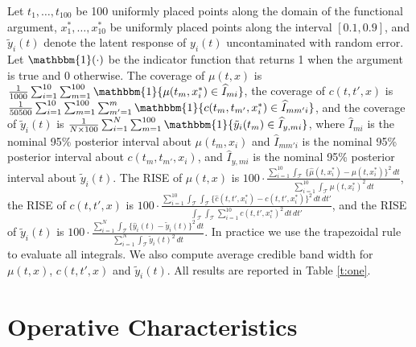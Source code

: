 \documentclass[useAMS,referee,usenatbib]{biom}
\begin{document}
Let $t_{1}, \ldots, t_{100}$ be 100 uniformly placed points along the domain of the functional argument, $x^{*}_{1},\ldots,x^{*}_{10}$ be uniformly placed points along the interval $[0.1, 0.9]$, and $\tilde{y}_{i}(t)$ denote the latent response of $y_{i}(t)$ uncontaminated with random error. Let $\mathbbm{1}(\cdot)$ be the indicator function that returns 1 when the argument is true and 0 otherwise. The coverage of $\mu(t, x)$ is $\frac{1}{1000}\sum_{i=1}^{10}\sum_{m=1}^{100}\mathbbm{1}\{\mu(t_{m}, x^{*}_{i}) \in \widehat{I}_{mi}\}$, the coverage of $c(t, t', x)$ is $\frac{1}{50500}\sum_{i=1}^{10}\sum_{m=1}^{100}\sum_{m'=1}^{m}\mathbbm{1}\{c(t_{m},t_{m'},x^{*}_{i})\in \widehat{I}_{mm'i}\}$, and the coverage of $\tilde{y}_{i}(t)$ is $\frac{1}{N\times 100}\sum_{i=1}^{N}\sum_{m=1}^{100}\mathbbm{1}\{\tilde{y}_{i}(t_{m}) \in \widehat{I}_{y,mi}\}$, where $\widehat{I}_{mi}$ is the nominal 95\% posterior interval about $\mu(t_{m}, x_{i})$ and $\widehat{I}_{mm'i}$ is the nominal 95\% posterior interval about $c(t_{m},t_{m'}, x_{i})$, and $\widehat{I}_{y,mi}$ is the nominal 95\% posterior interval about $\tilde{y}_{i}(t)$. The RISE of $\mu(t, x)$ is $100\cdot\frac{\sum_{i=1}^{10}\int_{\mathcal{T}}\,\{\widehat{\mu}(t, x^{*}_{i}) - \mu(t, x_{i}^{*})\}^{2}\,dt}{\sum_{i=1}^{10}\int_{\mathcal{T}}\mu(t, x_{i}^{*})^{2}\,dt}$, the RISE of $c(t, t', x)$ is $100 \cdot  \frac{\sum_{i=1}^{10}\int_{\mathcal{T}}\int_{\mathcal{T}}\{\widehat{c}(t,t', x_{i}^{*})-c(t,t',x_{i}^{*})\}^{2}\,dt\,dt'}{\int_{\mathcal{T}}\int_{\mathcal{T}}\sum_{i=1}^{10}c(t,t',x_{i}^{*})^{2}\,dt\,dt'}$, and the RISE of $\tilde{y}_{i}(t)$ is $100\cdot \frac{\sum_{i=1}^{N}\int_{\mathcal{T}}\{\widehat{y}_{i}(t)-\tilde{y}_{i}(t)\}^{2}\,dt}{\sum_{i=1}^{N}\int_{\mathcal{T}}\tilde{y}_{i}(t)^{2}\,dt}$. In practice we use the trapezoidal rule to evaluate all integrals. We also compute average credible band width for $\mu(t, x)$, $c(t, t', x)$ and $\tilde{y}_{i}(t)$. All results are reported in Table \ref{t:one}.

\section{Operative Characteristics}
\label{s:simulation}
\end{document}

